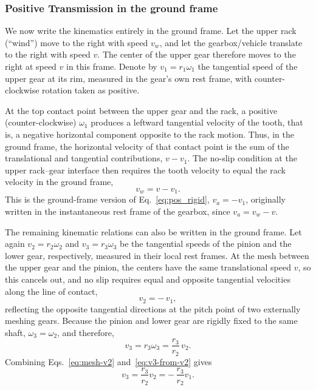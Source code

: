 \documentclass[a4paper]{article}
\begin{document}
\subsubsection{Positive Transmission in the ground frame}
\label{sec:gearbox-ground-frame}

We now write the kinematics entirely in the ground frame. Let the upper rack
(``wind'') move to the right with speed $v_w$, and let the gearbox/vehicle
translate to the right with speed $v$. The center of the upper gear therefore
moves to the right at speed $v$ in this frame. Denote by
$
v_1 = r_1 \omega_1
$
the tangential speed of the upper gear at its rim, measured in the gear's own
rest frame, with counter-clockwise rotation taken as positive.

At the top contact point between the upper gear and the rack, a positive
(counter-clockwise) \(\omega_1\) produces a leftward tangential velocity of the
tooth, that is, a negative horizontal component opposite to the rack motion.
Thus, in the ground frame, the horizontal velocity of that contact point is
the sum of the translational and tangential contributions, \(v-v_1\).
The no-slip condition at the upper rack--gear interface then requires the tooth
velocity to equal the rack velocity in the ground frame,
\begin{equation}
v_w = v - v_1.
\label{eq:upper-noslip-ground}
\end{equation}
This is the ground-frame version of Eq.~\eqref{eq:pos_rigid}, $v_a = -v_1$, originally written in the instantaneous rest frame of the gearbox, since $v_a=v_w-v$.


The remaining kinematic relations can also be written in the ground frame.
Let again  $
v_2 = r_2 \omega_2$ and $ v_3 = r_3 \omega_3
$
be the tangential speeds of the pinion and the lower gear, respectively,
measured in their local rest frames. At the mesh between the upper gear and the
pinion, the centers have the same translational speed $v$, so this cancels
out, and no slip requires equal and opposite tangential velocities along the
line of contact,
\begin{equation}
v_2 = -\,v_1,
\label{eq:mesh-v2}
\end{equation}
reflecting the opposite tangential directions at the pitch point of two externally meshing gears.
Because the pinion and lower gear are rigidly fixed to the same shaft,  $\omega_3 = \omega_2$, and  therefore,
\begin{equation}
v_3 = r_3 \omega_3 = \frac{r_3}{r_2}\,v_2.
\label{eq:v3-from-v2}
\end{equation}
Combining Eqs.~\eqref{eq:mesh-v2} and~\eqref{eq:v3-from-v2} gives
\begin{equation}
v_3 = \frac{r_3}{r_2} v_2
    = -\,\frac{r_3}{r_2} v_1.
\label{eq:v3-v1}
\end{equation}
\end{document}
